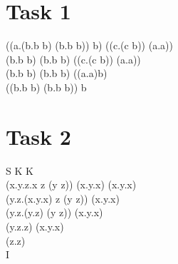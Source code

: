 \documentclass{article}
\begin{document}
\section{Task 1}

((\lambda a.(\lambda b.b b) (\lambda b.b b)) b) ((\lambda c.(c b)) (\lambda a.a)) \to\\
(\lambda b.b b) (\lambda b.b b) ((\lambda c.(c b)) (\lambda a.a)) \to\\
(\lambda b.b b) (\lambda b.b b)  ((\lambda a.a)b) \to\\
((\lambda b.b b) (\lambda b.b b)) b


\section{Task 2}

S K K 	\equiv\\
(\lambda x.\lambda y.\lambda z.x z (y z)) (\lambda x.\lambda y.x) (\lambda x.\lambda y.x) \to\\
(\lambda y.\lambda z.(\lambda x.\lambda y.x) z (y z)) (\lambda x.\lambda y.x) \to\\ 
(\lambda y.\lambda z.(\lambda y.z) (y z)) (\lambda x.\lambda y.x) \to\\ 
(\lambda y.\lambda z.z) (\lambda x.\lambda y.x) \to\\
(\lambda z.z) \equiv\\
I
\end{document}
